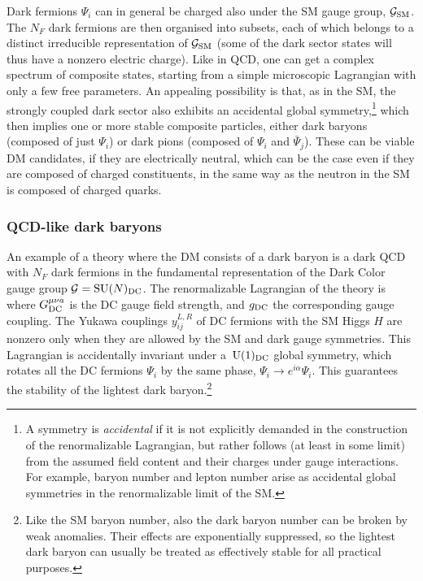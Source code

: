 \smallskip
 
 Dark fermions $\Psi_i$ can in general be charged also under the SM gauge group, $\mathcal{G}_{\rm SM}$. The $N_F$ dark fermions are then organised into subsets, each of which belongs to a distinct irreducible representation of  $\mathcal{G}_{\rm SM}$ (some of the dark sector states will thus have a nonzero electric charge). Like in QCD, one can get a complex spectrum of composite states, starting from a simple microscopic Lagrangian with only a few free parameters. An appealing possibility is that, as in the SM, the strongly coupled dark sector also exhibits an accidental global symmetry,\footnote{A symmetry is {\em accidental} if it is not explicitly demanded in the construction of the renormalizable Lagrangian, but rather follows (at least in some limit)
from the assumed field content and their charges under gauge interactions. 
For example, baryon number and lepton number arise as accidental global symmetries 
in the renormalizable limit of the SM.} which then implies one or more stable composite particles, either dark baryons (composed of just $\Psi_i$) or dark pions (composed of $\Psi_i$ and $\bar\Psi_j$). 
These can be viable DM candidates, if they are electrically neutral, which can be the case even if they are composed of charged constituents, in the same way as the neutron in the SM is composed of charged quarks. 



\subsubsection{QCD-like dark baryons}
An example of a theory where the DM consists of a dark baryon is a dark QCD with $N_F$
dark fermions in the fundamental representation of the Dark Color gauge group $\mathcal{G}={\rm SU}(N)_{\rm DC}$. 
The renormalizable Lagrangian of the theory is
\beq
\label{eq:Lag:dark:baryon}
\eeq
where $G_{{\rm DC}}^{\mu\nu a}$ is the DC gauge field strength, and $g_{\rm DC}$ the corresponding gauge coupling. The Yukawa couplings $y_{ij}^{L,R}$ of DC fermions with the SM Higgs $H$ are nonzero only when they are allowed by the SM and dark gauge symmetries. 
This Lagrangian is accidentally invariant under a $\,{\rm U}(1)_{\rm DC}$ global symmetry, 
which rotates all the DC fermions $\Psi_i$ by the same phase, $\Psi_i \to e^{i\alpha} \Psi_i$. 
This guarantees the stability of the lightest dark baryon.\footnote{Like the SM baryon number, 
also the dark baryon number can be broken by weak anomalies.
Their effects are exponentially suppressed, 
so the lightest dark baryon can usually be treated as effectively stable for all practical purposes.}


